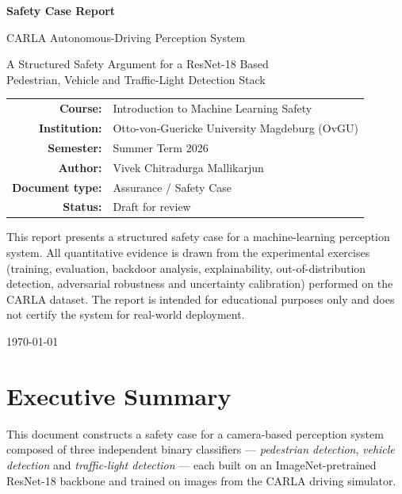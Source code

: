 \documentclass[11pt,a4paper]{article}
\begin{document}
\begin{titlepage}
\centering
\vspace*{1.5cm}
{\Huge\bfseries Safety Case Report\par}
\vspace{0.6cm}
{\LARGE CARLA Autonomous-Driving Perception System\par}
\vspace{0.4cm}
{\large A Structured Safety Argument for a ResNet-18 Based\\ Pedestrian, Vehicle and Traffic-Light Detection Stack\par}
\vspace{2.0cm}

\begin{tabular}{rl}
\textbf{Course:} & Introduction to Machine Learning Safety \\
\textbf{Institution:} & Otto-von-Guericke University Magdeburg (OvGU) \\
\textbf{Semester:} & Summer Term 2026 \\
\textbf{Author:} & Vivek Chitradurga Mallikarjun \\
\textbf{Document type:} & Assurance / Safety Case \\
\textbf{Status:} & Draft for review \\
\end{tabular}

\vfill
{\small This report presents a structured safety case for a machine-learning
perception system. All quantitative evidence is drawn from the experimental
exercises (training, evaluation, backdoor analysis, explainability,
out-of-distribution detection, adversarial robustness and uncertainty
calibration) performed on the CARLA dataset. The report is intended for
educational purposes only and does not certify the system for real-world
deployment.\par}
\vspace{1cm}
{\small \today}
\end{titlepage}

\tableofcontents
\newpage

\section{Executive Summary}
This document constructs a safety case for a camera-based perception system
composed of three independent binary classifiers --- \emph{pedestrian
detection}, \emph{vehicle detection} and \emph{traffic-light detection} ---
each built on an ImageNet-pretrained ResNet-18 backbone and trained on images
from the CARLA driving simulator.
\end{document}

